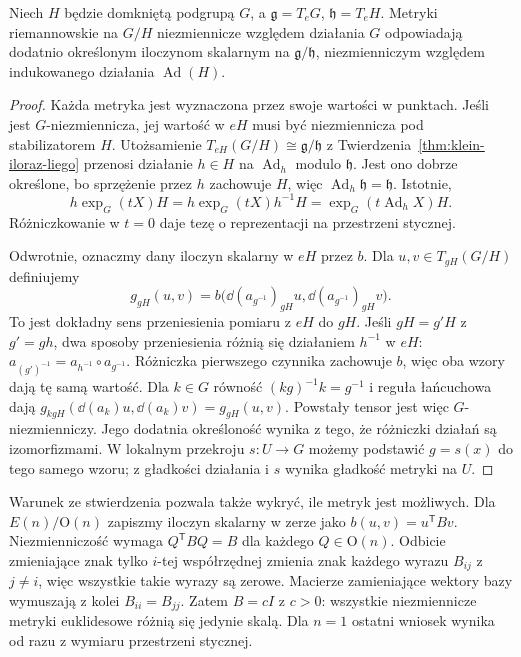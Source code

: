 \begin{stwierdzenie}
\label{prop:klein-metryka-niezmiennicza}
Niech $H$ będzie domkniętą podgrupą $G$, a
$\mathfrak g=T_eG$, $\mathfrak h=T_eH$. Metryki riemannowskie
na $G/H$ niezmiennicze względem działania $G$ odpowiadają
dodatnio określonym iloczynom skalarnym na
$\mathfrak g/\mathfrak h$, niezmienniczym względem
indukowanego działania $\operatorname{Ad}(H)$.
\end{stwierdzenie}
\begin{proof}
Każda metryka jest wyznaczona przez swoje wartości w punktach.
Jeśli jest $G$-niezmiennicza, jej wartość w $eH$ musi być
niezmiennicza pod stabilizatorem $H$. Utożsamienie
$T_{eH}(G/H)\cong\mathfrak g/\mathfrak h$ z
Twierdzenia~\ref{thm:klein-iloraz-liego} przenosi działanie
$h\in H$ na $\operatorname{Ad}_h$ modulo $\mathfrak h$.
Jest ono dobrze określone, bo sprzężenie przez $h$
zachowuje $H$, więc $\operatorname{Ad}_h\mathfrak h=\mathfrak h$.
Istotnie,
\[
 h\exp_G(tX)H
 =h\exp_G(tX)h^{-1}H
 =\exp_G(t\operatorname{Ad}_hX)H.
\]
Różniczkowanie w $t=0$ daje tezę o reprezentacji na
przestrzeni stycznej.

Odwrotnie, oznaczmy dany iloczyn skalarny w $eH$ przez $b$.
Dla $u,v\in T_{gH}(G/H)$ definiujemy
\[
 g_{gH}(u,v)
 =b\bigl(\dd(a_{g^{-1}})_{gH}u,\dd(a_{g^{-1}})_{gH}v\bigr).
\]
To jest dokładny sens przeniesienia pomiaru z $eH$ do $gH$.
Jeśli $gH=g'H$ z $g'=gh$, dwa sposoby przeniesienia
różnią się działaniem $h^{-1}$ w $eH$:
$a_{(g')^{-1}}=a_{h^{-1}}\circ a_{g^{-1}}$.
Różniczka pierwszego czynnika zachowuje $b$,
więc oba wzory dają tę samą wartość.
Dla $k\in G$ równość $(kg)^{-1}k=g^{-1}$
i reguła łańcuchowa dają
$g_{kgH}(\dd(a_k)u,\dd(a_k)v)=g_{gH}(u,v)$.
Powstały tensor jest więc $G$-niezmienniczy.
Jego dodatnia określoność wynika z tego, że różniczki działań
są izomorfizmami. W lokalnym przekroju $s:U\to G$ możemy
podstawić $g=s(x)$ do tego samego wzoru;
z gładkości działania i $s$ wynika gładkość metryki na $U$.
\end{proof}

Warunek ze stwierdzenia pozwala także wykryć, ile metryk
jest możliwych. Dla $E(n)/\mathrm O(n)$ zapiszmy iloczyn
skalarny w zerze jako $b(u,v)=u^{\mathsf T}Bv$.
Niezmienniczość wymaga $Q^{\mathsf T}BQ=B$ dla każdego
$Q\in\mathrm O(n)$. Odbicie zmieniające znak tylko $i$-tej
współrzędnej zmienia znak każdego wyrazu $B_{ij}$ z $j\ne i$,
więc wszystkie takie wyrazy są zerowe.
Macierze zamieniające wektory bazy wymuszają z kolei
$B_{ii}=B_{jj}$. Zatem $B=cI$ z $c>0$:
wszystkie niezmiennicze metryki euklidesowe różnią się
jedynie skalą. Dla $n=1$ ostatni wniosek wynika od razu
z wymiaru przestrzeni stycznej.

